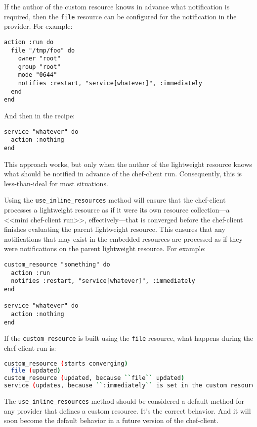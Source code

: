 If the author of the custom resource knows in advance what notification is required, then the \lstinline!file! resource can be configured for the notification in the provider. For example:

\begin{lstlisting}[label=lst:cookbook-lwrp-inline-resources3]
action :run do
  file "/tmp/foo" do
    owner "root"
    group "root"
    mode "0644"
    notifies :restart, "service[whatever]", :immediately
  end
end
\end{lstlisting}

And then in the recipe:

\begin{lstlisting}[label=lst:cookbook-lwrp-inline-resources4]
service "whatever" do
  action :nothing
end
\end{lstlisting}

This approach works, but only when the author of the lightweight resource knows what should be notified in advance of the chef-client run. Consequently, this is less-than-ideal for most situations.

Using the \lstinline!use_inline_resources! method will ensure that the chef-client processes a lightweight resource as if it were its own resource collection—a <<mini chef-client run>>, effectively—that is converged before the chef-client finishes evaluating the parent lightweight resource. This ensures that any notifications that may exist in the embedded resources are processed as if they were notifications on the parent lightweight resource. For example:

\begin{lstlisting}[label=lst:cookbook-lwrp-inline-resources5]
custom_resource "something" do
  action :run
  notifies :restart, "service[whatever]", :immediately
end

service "whatever" do
  action :nothing
end
\end{lstlisting}

If the \lstinline!custom_resource! is built using the \lstinline!file! resource, what happens during the chef-client run is:

\begin{lstlisting}[language=Bash,label=lst:cookbook-lwrp-inline-resources6]
custom_resource (starts converging)
  file (updated)
custom_resource (updated, because ``file`` updated)
service (updates, because ``:immediately`` is set in the custom resource)
\end{lstlisting}

The \lstinline!use_inline_resources! method should be considered a default method for any provider that defines a custom resource. It's the correct behavior. And it will soon become the default behavior in a future version of the chef-client.

